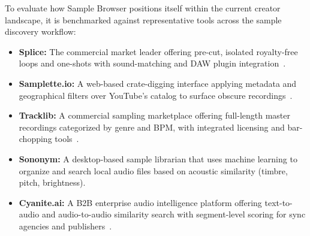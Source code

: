 To evaluate how Sample Browser positions itself within the current creator landscape, it is benchmarked against representative tools across the sample discovery workflow:

\begin{itemize}
    \item \textbf{Splice:} The commercial market leader offering pre-cut, isolated royalty-free loops and one-shots with sound-matching and DAW plugin integration~\cite{ref:mbw_splice, ref:splice_support_search}.
    \item \textbf{Samplette.io:} A web-based crate-digging interface applying metadata and geographical filters over YouTube's catalog to surface obscure recordings~\cite{ref:samplette, ref:musicradar_samplette}.
    \item \textbf{Tracklib:} A commercial sampling marketplace offering full-length master recordings categorized by genre and BPM, with integrated licensing and bar-chopping tools~\cite{ref:tracklib2024, ref:routenote_tracklib}.
    \item \textbf{Sononym:} A desktop-based sample librarian that uses machine learning to organize and search local audio files based on acoustic similarity (timbre, pitch, brightness).
    \item \textbf{Cyanite.ai:} A B2B enterprise audio intelligence platform offering text-to-audio and audio-to-audio similarity search with segment-level scoring for sync agencies and publishers~\cite{ref:cyanite_advanced_blog, ref:cyanite_api_adv}.
\end{itemize}

